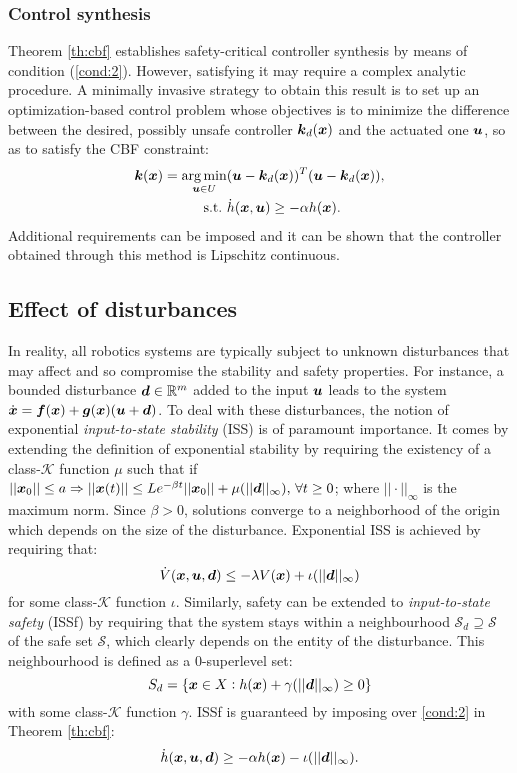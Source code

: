 \subsubsection{Control synthesis}
Theorem \ref{th:cbf} establishes safety-critical controller 
synthesis by means of condition (\ref{cond:2}). However, satisfying  it may require a complex analytic procedure. A minimally invasive strategy to obtain this result is to set up an optimization-based control problem whose objectives is to minimize the difference between the desired, possibly unsafe controller $\boldsymbol{k}_d(\boldsymbol{x})$ and the actuated one $\boldsymbol{u}$, so as to satisfy the CBF constraint:
\begin{equation}\label{eq:optprob}
\begin{aligned}
\boldsymbol{k}(\boldsymbol{x})=\underset{\boldsymbol{u}\in U}{\arg\min}  &(\boldsymbol{u}-\boldsymbol{k}_d(\boldsymbol{x}))^T(\boldsymbol{u}-\boldsymbol{k}_d(\boldsymbol{x})), \\ 
\mathrm{s.t.}\,\, &\dot{h}(\boldsymbol{x},\boldsymbol{u})\geq -\alpha h(\boldsymbol{x}).
\end{aligned}
\end{equation}
Additional requirements can be imposed and it can be shown that the controller obtained through this method is Lipschitz continuous.
\subsection{Effect of disturbances}
In reality, all robotics systems are typically subject to unknown disturbances that may affect and so compromise the stability and safety properties. For instance, a bounded disturbance $\boldsymbol{d}\in\mathbb{R}^m$ added to the input $\boldsymbol{u}$ leads to the system $\dot{\boldsymbol{x}} = \boldsymbol{f}(\boldsymbol{x})+\boldsymbol{g}(\boldsymbol{x})(\boldsymbol{u}+\boldsymbol{d})$. To deal with these disturbances, the notion of exponential \textit{input-to-state stability} (ISS) is of paramount importance. It comes by extending the definition of exponential stability by requiring the existency of a class-$\mathcal{K}$ function $\mu$ such that if $||\boldsymbol{x}_0||  \leq a \Rightarrow  ||\boldsymbol{x}(t)||\leq Le^{-\beta t}||\boldsymbol{x}_0||+ \mu(||\boldsymbol{d}||_\infty ),\, \forall t \geq 0$; where $||\cdot||_\infty$  is the maximum norm.
Since $\beta>0$, solutions converge to a neighborhood of the origin which depends on the size of the disturbance. Exponential ISS is achieved by requiring that: 
\begin{equation}\label{eq:iss}
\dot{V}(\boldsymbol{x},\boldsymbol{u},\boldsymbol{d}) \leq -\lambda V(\boldsymbol{x})+\iota( ||\boldsymbol{d}||_\infty)
\end{equation} for some class-$\mathcal{K}$ function $\iota$. Similarly, safety can be extended to \textit{input-to-state safety} (ISSf) by requiring that the system stays within a neighbourhood $\mathcal{S}_d \supseteq  \mathcal{S}$ of the safe set $\mathcal{S}$, which clearly depends on the entity of the disturbance.
This neighbourhood is defined as a 0-superlevel set: 
\begin{equation}
    S_d = \{\boldsymbol{x} \in X: h(\boldsymbol{x}) + \gamma(||\boldsymbol{d}||_\infty)\geq 0\}
\end{equation}
with some class-$\mathcal{K}$ function $\gamma$. ISSf is guaranteed by imposing over \eqref{cond:2} in Theorem \ref{th:cbf}: 
\begin{equation}
    \dot{h}(\boldsymbol{x},\boldsymbol{u},\boldsymbol{d})\geq -\alpha h(\boldsymbol{x}) - \iota(||\boldsymbol{d}||_\infty).
\end{equation}